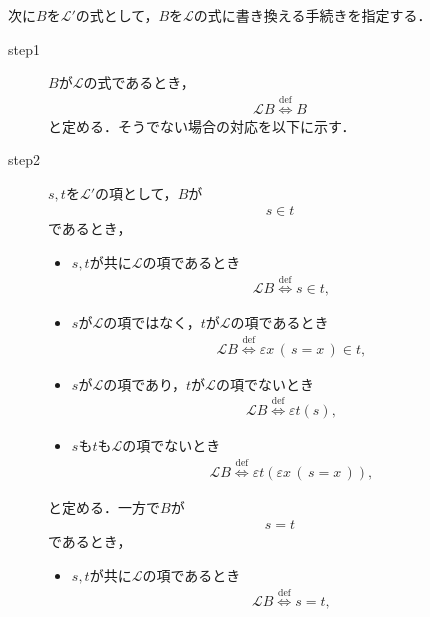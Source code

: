 	次に$B$を$\mathcal{L}'$の式として，$B$を$\mathcal{L}$の式に書き換える手続きを指定する．
	\begin{description}
		\item[step1] $B$が$\mathcal{L}$の式であるとき，
			\begin{align}
				\mathcal{L}B \overset{\mathrm{def}}{\Longleftrightarrow} B
			\end{align}
			と定める．そうでない場合の対応を以下に示す．
			
		\item[step2] $s,t$を$\mathcal{L}'$の項として，$B$が
			\begin{align}
				s \in t
			\end{align}
			であるとき，
			\begin{itemize}
				\item $s,t$が共に$\mathcal{L}$の項であるとき
					\begin{align}
						\mathcal{L}B \overset{\mathrm{def}}{\Longleftrightarrow}
						s \in t,
					\end{align}
				
				\item $s$が$\mathcal{L}$の項ではなく，$t$が$\mathcal{L}$の項であるとき
					\begin{align}
						\mathcal{L}B \overset{\mathrm{def}}{\Longleftrightarrow}
						\varepsilon x\, (\, s=x\, ) \in t,
					\end{align}
				
				\item $s$が$\mathcal{L}$の項であり，$t$が$\mathcal{L}$の項でないとき
					\begin{align}
						\mathcal{L}B \overset{\mathrm{def}}{\Longleftrightarrow}
						\varepsilon t(s),
					\end{align}
					
				\item $s$も$t$も$\mathcal{L}$の項でないとき
					\begin{align}
						\mathcal{L}B \overset{\mathrm{def}}{\Longleftrightarrow}
						\varepsilon t(\varepsilon x\, (\, s=x\, )),
					\end{align}
			\end{itemize}
			と定める．一方で$B$が
			\begin{align}
				s = t
			\end{align}
			であるとき，
			\begin{itemize}
				\item $s,t$が共に$\mathcal{L}$の項であるとき
					\begin{align}
						\mathcal{L}B \overset{\mathrm{def}}{\Longleftrightarrow}
						s = t,
					\end{align}
				

\end{itemize}
\end{description}
